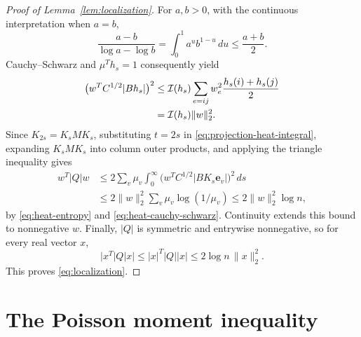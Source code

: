 \documentclass[11pt]{article}
\theoremstyle{remark}
\numberwithin{equation}{section}
\begin{document}
\begin{proof}[Proof of Lemma~\ref{lem:localization}]
For $a,b>0$, with the continuous interpretation when $a=b$,
\[
 \frac{a-b}{\log a-\log b}
   =\int_0^1a^ub^{1-u}\,du\le\frac{a+b}{2}.
\]
Cauchy--Schwarz and $\mu^Th_s=1$ consequently yield
\begin{align}
 \bigl(w^TC^{1/2}|Bh_s|\bigr)^2
 &\le \mathcal I(h_s)
          \sum_{e=ij}w_e^2\frac{h_s(i)+h_s(j)}2 \notag\\
 &=\mathcal I(h_s)\|w\|_2^2.
 \label{eq:heat-cauchy-schwarz}
\end{align}
Since $K_{2s}=K_sMK_s$, substituting $t=2s$ in
\eqref{eq:projection-heat-integral}, expanding $K_sMK_s$ into column
outer products, and applying the triangle inequality gives
\begin{align*}
 w^T|Q|w
 &\le 2\sum_v\mu_v\int_0^\infty
       \bigl(w^TC^{1/2}|BK_s\mathbf e_v|\bigr)^2\,ds\\
 &\le 2\|w\|_2^2\sum_v\mu_v\log(1/\mu_v)
 \le 2\|w\|_2^2\log n,
\end{align*}
by \eqref{eq:heat-entropy} and \eqref{eq:heat-cauchy-schwarz}.
Continuity extends this bound to nonnegative $w$. Finally, $|Q|$ is
symmetric and entrywise nonnegative, so for every real vector $x$,
\[
 \bigl|x^T|Q|x\bigr|
 \le |x|^T|Q||x|\le 2\log n\,\|x\|_2^2.
\]
This proves \eqref{eq:localization}.
\end{proof}

\section{The Poisson moment inequality}\label{app:poisson}
\end{document}
